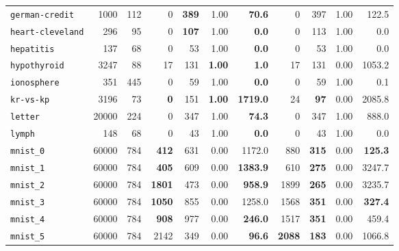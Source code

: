 \begin{tabular}{lccrrrrrrrr}
\texttt{german-credit} & \multicolumn{1}{r}{1000} & \multicolumn{1}{r}{112}  & 0 & \textbf{389} & 1.00 & \textbf{70.6} & 0 & 397 & 1.00 & 122.5\\
\texttt{heart-cleveland} & \multicolumn{1}{r}{296} & \multicolumn{1}{r}{95}  & 0 & \textbf{107} & 1.00 & \textbf{0.0} & 0 & 113 & 1.00 & 0.0\\
\texttt{hepatitis} & \multicolumn{1}{r}{137} & \multicolumn{1}{r}{68}  & 0 & 53 & 1.00 & \textbf{0.0} & 0 & 53 & 1.00 & 0.0\\
\texttt{hypothyroid} & \multicolumn{1}{r}{3247} & \multicolumn{1}{r}{88}  & 17 & 131 & \textbf{1.00} & \textbf{1.0} & 17 & 131 & 0.00 & 1053.2\\
\texttt{ionosphere} & \multicolumn{1}{r}{351} & \multicolumn{1}{r}{445}  & 0 & 59 & 1.00 & \textbf{0.0} & 0 & 59 & 1.00 & 0.1\\
\texttt{kr-vs-kp} & \multicolumn{1}{r}{3196} & \multicolumn{1}{r}{73}  & \textbf{0} & 151 & \textbf{1.00} & \textbf{1719.0} & 24 & \textbf{97} & 0.00 & 2085.8\\
\texttt{letter} & \multicolumn{1}{r}{20000} & \multicolumn{1}{r}{224}  & 0 & 347 & 1.00 & \textbf{74.3} & 0 & 347 & 1.00 & 888.0\\
\texttt{lymph} & \multicolumn{1}{r}{148} & \multicolumn{1}{r}{68}  & 0 & 43 & 1.00 & \textbf{0.0} & 0 & 43 & 1.00 & 0.0\\
\texttt{mnist\_0} & \multicolumn{1}{r}{60000} & \multicolumn{1}{r}{784}  & \textbf{412} & 631 & 0.00 & 1172.0 & 880 & \textbf{315} & 0.00 & \textbf{125.3}\\
\texttt{mnist\_1} & \multicolumn{1}{r}{60000} & \multicolumn{1}{r}{784}  & \textbf{405} & 609 & 0.00 & \textbf{1383.9} & 610 & \textbf{275} & 0.00 & 3247.7\\
\texttt{mnist\_2} & \multicolumn{1}{r}{60000} & \multicolumn{1}{r}{784}  & \textbf{1801} & 473 & 0.00 & \textbf{958.9} & 1899 & \textbf{265} & 0.00 & 3235.7\\
\texttt{mnist\_3} & \multicolumn{1}{r}{60000} & \multicolumn{1}{r}{784}  & \textbf{1050} & 855 & 0.00 & 1258.0 & 1568 & \textbf{351} & 0.00 & \textbf{327.4}\\
\texttt{mnist\_4} & \multicolumn{1}{r}{60000} & \multicolumn{1}{r}{784}  & \textbf{908} & 977 & 0.00 & \textbf{246.0} & 1517 & \textbf{351} & 0.00 & 459.4\\
\texttt{mnist\_5} & \multicolumn{1}{r}{60000} & \multicolumn{1}{r}{784}  & 2142 & 349 & 0.00 & \textbf{96.6} & \textbf{2088} & \textbf{183} & 0.00 & 1066.8\\

\end{tabular}
